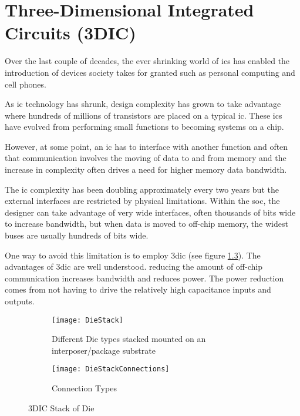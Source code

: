 

\chapter{Three-Dimensional Integrated Circuits (3DIC)}
\label{chap-three}

Over the last couple of decades, the ever shrinking world of \acp{ic} has enabled the introduction of devices society takes for granted such as personal computing and cell phones.

As \ac{ic} technology has shrunk, design complexity has grown to take advantage where hundreds of millions of transistors are placed on a typical \ac{ic}.
These \acp{ic} have evolved from performing small functions to becoming systems on a chip.

However, at some point, an \ac{ic} has to interface with another function and often that communication involves the moving of data to and from memory and the increase in complexity often drives a need for higher memory data bandwidth. 

The \ac{ic} complexity has been doubling approximately every two years but the external interfaces are restricted by physical limitations.
Within the \ac{soc}, the designer can take advantage of very wide interfaces, often thousands of bits wide to increase bandwidth, but when data is moved to off-chip memory, the widest buses are usually hundreds of bits wide.

One way to avoid this limitation is to employ \ac{3dic} (see figure \ref{fig:3DIC Die}). The advantages of \ac{3dic} are well understood. reducing the amount of off-chip communication increases bandwidth and reduces power. The power reduction comes from not having to drive the relatively
high capacitance inputs and outputs.

\begin{figure}
\centering
\begin{subfigure}{.8\textwidth}
  \centering
  \texttt{[image: DieStack]}
  \captionsetup{justification=centering, skip=5pt}
  \caption{Different Die types stacked mounted on an interposer/package substrate}
  \label{fig:Die Stack}
\end{subfigure}%

\bigskip

\begin{subfigure}{.8\textwidth}
  \centering
  \texttt{[image: DieStackConnections]}
  \captionsetup{justification=centering, skip=5pt}
  \caption{Connection Types}
  \label{fig:Die Stack Connection Types}
\end{subfigure}
\captionsetup{justification=centering, skip=12pt}
\caption[3DIC Stack of Die]{3DIC Stack of Die}
\label{fig:3DIC Die}
\end{figure}


